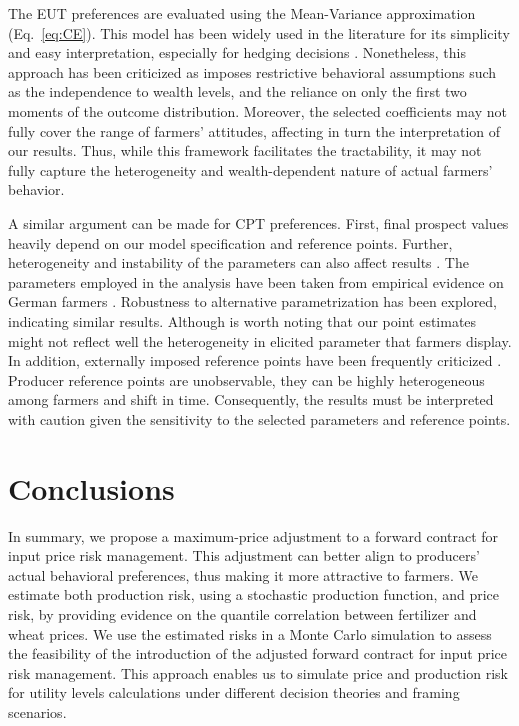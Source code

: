 \documentclass[12pt,a4paper]{article}
\begin{document}
The EUT preferences are evaluated using the Mean-Variance approximation (Eq.~\ref{eq:CE}). This model has been widely used in the literature for its simplicity and easy interpretation, especially for hedging decisions \citep{Spada2025}. Nonetheless, this approach has been criticized as imposes restrictive behavioral assumptions such as the independence to wealth levels, and the reliance on only the first two moments of the outcome distribution. Moreover, the selected coefficients may not fully cover the range of farmers' attitudes, affecting in turn the interpretation of our results. Thus, while this framework facilitates the tractability, it may not fully capture the heterogeneity and wealth-dependent nature of actual farmers' behavior.

A similar argument can be made for CPT preferences. First, final prospect values heavily depend on our model specification and reference points. Further, heterogeneity and instability of the parameters can also affect results \citep{Finger2024}. The parameters employed in the analysis have been taken from empirical evidence on German farmers \citep{Rommel2023}. Robustness to alternative parametrization has been explored, indicating similar results. Although is worth noting that our point estimates might not reflect well the heterogeneity in elicited parameter that farmers display. In addition, externally imposed reference points have been frequently criticized \citep{KoszegiRabin2006, KoszegiRabin2007}. Producer reference points are unobservable, they can be highly heterogeneous among farmers and shift in time. Consequently, the results must be interpreted with caution given the sensitivity to the selected parameters and reference points.

\section{Conclusions}
\label{sec:conclusions}

In summary, we propose a maximum-price adjustment to a forward contract for input price risk management. This adjustment can better align to producers' actual behavioral preferences, thus making it more attractive to farmers. We estimate both production risk, using a stochastic production function, and price risk, by providing evidence on the quantile correlation between fertilizer and wheat prices. We use the estimated risks in a Monte Carlo simulation to assess the feasibility of the introduction of the adjusted forward contract for input price risk management. This approach enables us to simulate price and production risk for utility levels calculations under different decision theories and framing scenarios.
\end{document}
